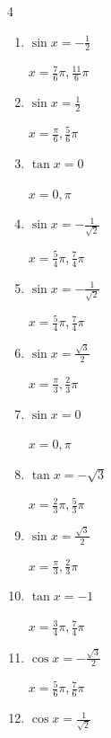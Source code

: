 \begin{multicols}{4}
\begin{enumerate}
  \item $\displaystyle \sin{x}  = -\frac{1}{2}$

        $\displaystyle x = \frac{7}{6}\pi , \frac{11}{6}\pi$

\columnbreak %

\resetques

  \item $\displaystyle \sin{x}  = \frac{1}{2}$

        $\displaystyle x = \frac{\pi}{6} , \frac{5}{6}\pi$

  \item $\displaystyle \tan{x}  = 0$

        $\displaystyle x = 0 , \pi$

  \item $\displaystyle \sin{x}  = -\frac{1}{\sqrt{2}}$

        $\displaystyle x = \frac{5}{4}\pi , \frac{7}{4}\pi$

  \item $\displaystyle \sin{x}  = -\frac{1}{\sqrt{2}}$

        $\displaystyle x = \frac{5}{4}\pi , \frac{7}{4}\pi$

  \item $\displaystyle \sin{x}  = \frac{\sqrt{3}}{2}$

        $\displaystyle x = \frac{\pi}{3} , \frac{2}{3}\pi$

  \item $\displaystyle \sin{x}  = 0$

        $\displaystyle x = 0 , \pi$

  \item $\displaystyle \tan{x}  = -\sqrt{3}$

        $\displaystyle x = \frac{2}{3}\pi , \frac{5}{3}\pi$

  \item $\displaystyle \sin{x}  = \frac{\sqrt{3}}{2}$

        $\displaystyle x = \frac{\pi}{3} , \frac{2}{3}\pi$

  \item $\displaystyle \tan{x}  = -1$

        $\displaystyle x = \frac{3}{4}\pi , \frac{7}{4}\pi$

  \item $\displaystyle \cos{x}  = -\frac{\sqrt{3}}{2}$

        $\displaystyle x = \frac{5}{6}\pi , \frac{7}{6}\pi$

  \item $\displaystyle \cos{x}  = \frac{1}{\sqrt{2}}$


\end{enumerate}
\end{multicols}
